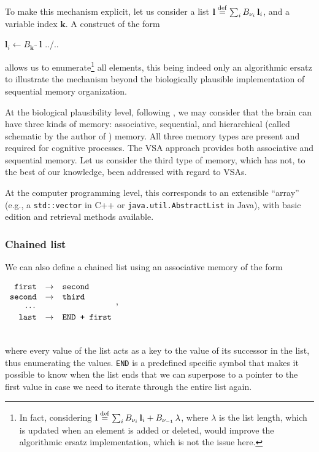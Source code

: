 \documentclass[sn-mathphys]{sn-jnl}
\newcommand{\defq}{\stackrel {\rm def}{=}}
\newcommand{\eqline}[1]{~\vspace{0.1cm}\\\centerline{$#1$}\vspace{0.1cm}\\}
\begin{document}
\begin{appendices}
To make this mechanism explicit, let us consider a list $\mathbf{l} \defq \sum_i B_{\mathbf{\nu}_i} \, \mathbf{l}_i$, and a variable index $\mathbf{k}$. A construct of the form
\begin{algorithmic}
   \State $\mathbf{l}_i \leftarrow B_{\mathbf{k}^\sim} \, \mathbf{l}$
\State ../..
\EndFor
\end{algorithmic}
allows us to enumerate\footnote{In fact, considering $\mathbf{l} \defq \sum_i B_{\mathbf{\nu}_i} \, \mathbf{l}_i + B_{\mathbf{\nu}_{-1}} \, \lambda$, where $\lambda$ is the list length, which is updated when an element is added or deleted, would improve the algorithmic ersatz implementation, which is not the issue here.} all elements, this being indeed only an algorithmic ersatz to illustrate the mechanism beyond the biologically plausible implementation of sequential memory organization.

At the biological plausibility level, following \cite{eichenbaum_memory_2017}, we may consider that the brain can have three kinds of memory: associative, sequential, and hierarchical (called schematic by the author of \cite{eichenbaum_memory_2017}) memory. All three memory types are present and required for cognitive processes. The VSA approach provides both associative and sequential memory. Let us consider the third type of memory, which has not, to the best of our knowledge, been addressed with regard to VSAs.

At the computer programming level, this corresponds to an extensible ``array'' (e.g., a {\tt std::vector} in C++ or {\tt java.util.AbstractList} in Java), with basic edition and retrieval methods available.

\subsubsection{Chained list}

We can also define a chained list using an associative memory of the form
  \eqline{\begin{array}{rcl}
      \mbox{\tt first} &\rightarrow& \mbox{\tt second} \\
      \mbox{\tt second} &\rightarrow& \mbox{\tt third} \\
      \cdots & \\
      \mbox{\tt last} &\rightarrow& \mbox{\tt END + first}
    \end{array},}
where every value of the list acts as a key to the value of its successor in the list, thus enumerating the values. {\tt END} is a predefined specific symbol that makes it possible to know when the list ends that we can superpose to a pointer to the first value in case we need to iterate through the entire list again.


\end{appendices}
\end{document}
